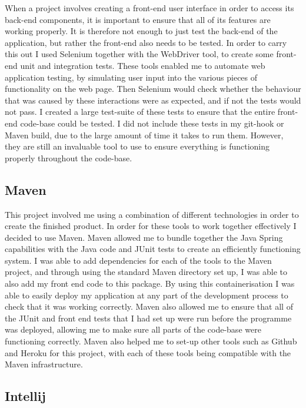 When a project involves creating a front-end user interface in order to access its back-end components, it is important to ensure that all of its features are working properly. It is therefore not enough to just test the back-end of the application, but rather the front-end also needs to be tested. In order to carry this out I used Selenium together with the WebDriver tool, to create some front-end unit and integration tests. These tools enabled me to automate web application testing, by simulating user input into the various pieces of functionality on the web page. Then Selenium would check whether the behaviour that was caused by these interactions were as expected, and if not the tests would not pass. I created a large test-suite of these tests to ensure that the entire front-end code-base could be tested. I did not include these tests in my git-hook or Maven build, due to the large amount of time it takes to run them. However, they are still an invaluable tool to use to ensure everything is functioning properly throughout the code-base.

\subsection{Maven \label{maven}}

This project involved me using a combination of different technologies in order to create the finished product. In order for these tools to work together effectively I decided to use Maven. Maven allowed me to bundle together the Java Spring capabilities with the Java code and JUnit tests to create an efficiently functioning system. I was able to add dependencies for each of the tools to the Maven project, and through using the standard Maven directory set up, I was able to also add my front end code to this package. By using this containerisation I was able to easily deploy my application at any part of the development process to check that it was working correctly. Maven also allowed me to ensure that all of the JUnit and front end tests that I had set up were run before the programme was deployed, allowing me to make sure all parts of the code-base were functioning correctly. Maven also helped me to set-up other tools such as Github and Heroku for this project, with each of these tools being compatible with the Maven infrastructure.

\subsection{Intellij \label{intellij}}

